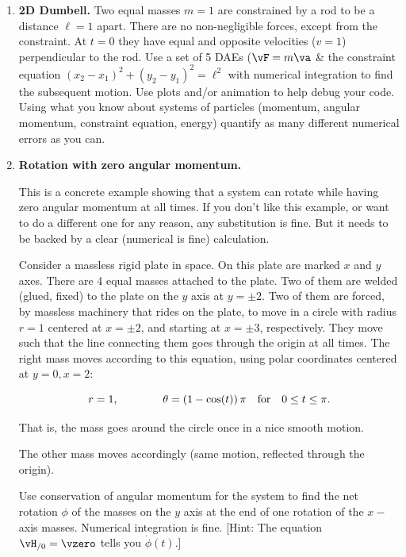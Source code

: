 \documentclass[11pt]{article}
\begin{document}
\begin{enumerate}
  
  \item{\bf 2D Dumbell.} \label{HW2Ddumbbell} Two equal masses $m=1$ are constrained by a rod to be a distance
  $\ell=1$ apart.  There are no non-negligible forces, except from the constraint. At $t=0$ they have equal and opposite velocities ($v=1$) perpendicular to the rod.  Use a set of 5 DAEs ($\vF=m\va$ \& the constraint equation $(x_2-x_1)^2 + (y_2-y_1)^2 = \ell^2$ with numerical integration to find the
  subsequent motion.  Use plots and/or animation to help debug your code.  Using what you know about  systems of particles (\eg momentum, angular momentum, constraint equation, energy) quantify as many different numerical errors   as you can.
  
  

  \item{\bf Rotation with zero angular momentum.}\label{HWwhatmeans2}
  
  This is a concrete example showing that a system can rotate while having zero angular momentum
  at all times.  If you don't like this example, or want to do a different one for any reason, any substitution
  is fine.  But it needs to be backed by a clear (numerical is fine) calculation.
  \par
  
  Consider a massless rigid plate in space.  On this plate are marked $x$ and $y$ axes.   
There are 4 equal masses attached to the plate.    Two of them are welded (glued, fixed) to the plate
on the $y$ axis at $y=\pm 2$.  Two of them are forced, by massless machinery that rides on the plate,
to move in a circle  with radius $r=1$ centered at $ x = \pm 2$, and starting at $x= \pm 3$,  respectively.   They move such that
the line connecting them goes through the origin at all times.  The right mass moves according to this
equation, using polar coordinates centered at $y=0, x=2$:

\[
r=1,  \qquad\qquad \theta =\left(1-\cos(t) \right)\pi   \quad \mbox{for} \quad \mbox  0\le t \le \pi.
\]
  
  That is, the mass goes around the circle once in a nice smooth motion.
  
  The other mass moves accordingly (same motion, reflected through the origin).  
  
  
  \par
  
  Use conservation of angular momentum for the system to find
  the net rotation $\phi$ of the masses on the $y$ axis at the end of one rotation of the $x-$ axis masses.
  Numerical integration is fine. [Hint:  The equation  $\vH_{/0}=\vzero$ tells you $\dot\phi(t)$.]  
  

\end{enumerate}
\end{document}
